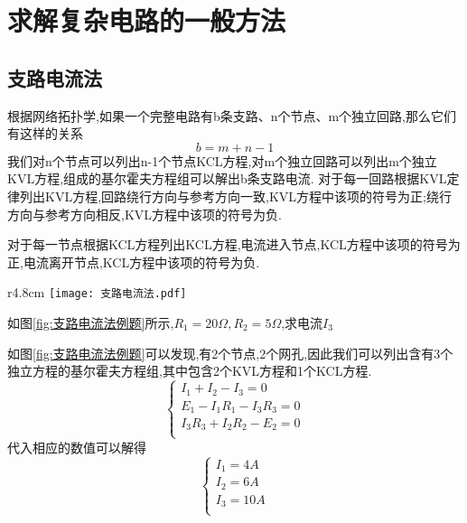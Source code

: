 \section{\K 求解复杂电路的一般方法}

\subsection{\K 支路电流法}
\Par 根据网络拓扑学,如果一个完整电路有b条支路、n个节点、m个独立回路,那么它们有这样的关系
$$
b=m+n-1
$$
我们对n个节点可以列出n-1个节点KCL方程,对m个独立回路可以列出m个独立KVL方程,组成的基尔霍夫方程组可以解出b条支路电流.
\Par 对于每一回路根据KVL定律列出KVL方程,回路绕行方向与参考方向一致,KVL方程中该项的符号为正;绕行方向与参考方向相反,KVL方程中该项的符号为负.

\Par 对于每一节点根据KCL方程列出KCL方程,电流进入节点,KCL方程中该项的符号为正,电流离开节点,KCL方程中该项的符号为负.

\begin{wrapfigure}{r}{4.8cm}
    \centering
    \texttt{[image: 支路电流法.pdf]}
    \caption{}
    \label{fig:支路电流法例题}
\end{wrapfigure}
\begin{example}\label{exp:支路电流法例题}
    如图\ref{fig:支路电流法例题}所示,$R_1=20\Omega ,R_2=5\Omega $,求电流$I_3$
\end{example}
\begin{solution}
如图\ref{fig:支路电流法例题}可以发现,有2个节点,2个网孔,因此我们可以列出含有3个独立方程的基尔霍夫方程组,其中包含2个KVL方程和1个KCL方程.
\begin{equation*}
    \begin{cases}
        I_1+I_2-I_3=0\\
        E_1-I_1R_1-I_3R_3=0\\
        I_3R_3+I_2R_2-E_2=0\\
    \end{cases}
\end{equation*}
代入相应的数值可以解得
\begin{equation*}
    \begin{cases}
        I_1=4A\\
        I_2=6A\\
        I_3=10A\\
    \end{cases}
\end{equation*}
\end{solution}

